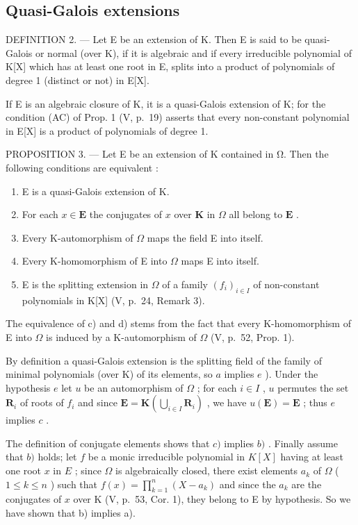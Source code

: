 \subsection{Quasi-Galois extensions}

DEFINITION 2. --- Let E be an extension of K. Then E is said to be quasi-Galois or normal (over K), if it is algebraic and if every irreducible polynomial of K{[}X{]} which has at least one root in E, splits into a product of polynomials of degree 1 (distinct or not) in E{[}X{]}.

If E is an algebraic closure of K, it is a quasi-Galois extension of K; for the condition (AC) of Prop. 1 (V, p.~19) asserts that every non-constant polynomial in E{[}X{]} is a product of polynomials of degree 1.

PROPOSITION 3. --- Let E be an extension of K contained in Ω. Then the following conditions are equivalent :

\begin{enumerate}
\def\labelenumi{\alph{enumi})}
\item
  E is a quasi-Galois extension of K.
\item
  For each \(x \in \mathbf{E}\) the conjugates of \(x\) over \(\mathbf{K}\) in \(\Omega\) all belong to \(\mathbf{E}\) .
\item
  Every K-automorphism of \(\Omega\) maps the field E into itself.
\item
  Every K-homomorphism of E into \(\Omega\) maps E into itself.
\item
  E is the splitting extension in \(\Omega\) of a family \((f_i)_{i\in I}\) of non-constant polynomials in K{[}X{]} (V, p.~24, Remark 3).
\end{enumerate}

The equivalence of c) and d) stems from the fact that every K-homomorphism of E into \(\Omega\) is induced by a K-automorphism of \(\Omega\) (V, p.~52, Prop. 1).

By definition a quasi-Galois extension is the splitting field of the family of minimal polynomials (over K) of its elements, so \(a\) implies \(e\) ). Under the hypothesis \(e\) let \(u\) be an automorphism of \(\Omega\) ; for each \(i \in I\) , \(u\) permutes the set \(\mathbf{R}_i\) of roots of \(f_i\) and since \(\mathbf{E} = \mathbf{K}\left(\bigcup_{i \in I} \mathbf{R}_i\right)\) , we have \(u(\mathbf{E}) = \mathbf{E}\) ; thus \(e\) implies \(c\) .

The definition of conjugate elements shows that \(c)\) implies \(b)\) . Finally assume that \(b)\) holds; let \(f\) be a monic irreducible polynomial in \(K[X]\) having at least one root \(x\) in \(E\) ; since \(\Omega\) is algebraically closed, there exist elements \(a_k\) of \(\Omega\) ( \(1 \leqslant k \leqslant n\) ) such that \(f(x) = \prod_{k=1}^{n} (X - a_k)\) and since the \(a_k\) are the conjugates of \(x\) over K (V, p.~53, Cor. 1), they belong to E by hypothesis. So we have shown that b) implies a).

